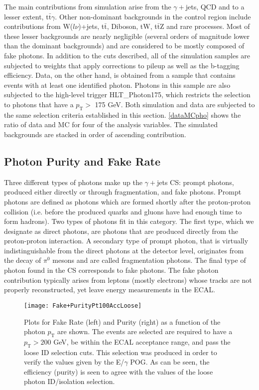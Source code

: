 The main contributions from simulation arise from the $\gamma+$jets, QCD and to a lesser extent, t$\bar{\text{t}}\gamma$. Other non-dominant backgrounds in the control region include contributions from W($l\nu$)+jets, t$\bar{\text{t}}$, Diboson, tW, t$\bar{\text{t}}$Z and rare processes. Most of these lesser backgrounds are nearly negligible (several orders of magnitude lower than the dominant backgrounds) and are considered to be mostly composed of fake photons. In addition to the cuts described, all of the simulation samples are subjected to weights that apply corrections to pileup as well as the b-tagging efficiency. Data, on the other hand, is obtained from a sample that contains events with at least one identified photon. Photons in this sample are also subjected to the high-level trigger HLT\_Photon175, which restricts the selection to photons that have a $p_\text{T} >$ 175 GeV. Both simulation and data are subjected to the same selection criteria established in this section. \autoref{dataMCpho} shows the ratio of data and MC for four of the analysis variables. The simulated backgrounds are stacked in order of ascending contribution.

\subsection{Photon Purity and Fake Rate}\label{purity&fakerate}

Three different types of photons make up the $\gamma+$jets CS: prompt photons, produced either directly or through fragmentation, and fake photons. Prompt photons are defined as photons which are formed shortly after the proton-proton collision (i.e. before the produced quarks and gluons have had enough time to form hadrons). Two types of photons fit in this category. The first type, which we designate as direct photons, are photons that are produced directly from the proton-proton interaction\cite{promptPho}. A secondary type of prompt photon, that is virtually indistinguishable from the direct photons at the detector level, originates from the decay of $\pi^0$ mesons and are called fragmentation photons. The final type of photon found in the CS corresponds to fake photons. The fake photon contribution typically arises from leptons (mostly electrons) whose tracks are not properly reconstructed, yet leave energy measurements in the ECAL.

\begin{figure}[H]
\begin{center}
\texttt{[image: Fake+PurityPt100AccLoose]}
\end{center}
\vspace{-1em}
\caption{Plots for Fake Rate (left) and Purity (right) as a function of the photon $p_\text{T}$ are shown. The events are selected are required to have a $p_\text{T} > 200$ GeV, be within the ECAL acceptance range, and pass the loose ID selection cuts. This selection was produced in order to verify the values given by the E/$\gamma$ POG. As can be seen, the efficiency (purity) is seen to agree with the values of the loose photon ID/isolation selection.}
\label{FakeRatePurityLoose}
\end{figure}

